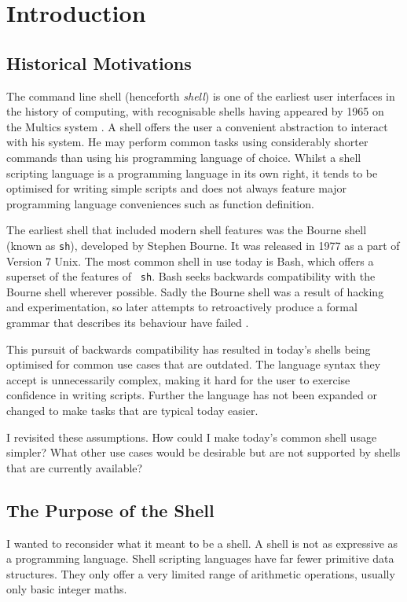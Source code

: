 \documentclass[12pt,twoside,notitlepage]{report}
\begin{document}
\cleardoublepage        %

\setcounter{page}{1}
\pagestyle{headings}

\chapter{Introduction}

\section{Historical Motivations}
The command line shell (henceforth \emph{shell}) is one of the
earliest user interfaces in the history of computing, with
recognisable shells having appeared by 1965 on the Multics system
\cite{multics}. A shell offers the user a convenient abstraction to
interact with his system. He may perform common tasks using
considerably shorter commands than using his programming language of
choice. Whilst a shell scripting language is a programming language in
its own right, it tends to be optimised for writing simple scripts and
does not always feature major programming language conveniences such
as function definition.

The earliest shell that included modern shell features was the Bourne
shell (known as {\tt sh}), developed by Stephen Bourne. It was
released in 1977 as a part of Version 7 Unix. The most common shell in
use today is Bash, which offers a superset of the features of {\tt
  sh}. Bash seeks backwards compatibility with the Bourne shell
wherever possible. Sadly the Bourne shell was a result of hacking and
experimentation, so later attempts to retroactively produce a formal
grammar that describes its behaviour have failed \cite{bourne}.

This pursuit of backwards compatibility has resulted in today's shells
being optimised for common use cases that are outdated. The language
syntax they accept is unnecessarily complex, making it hard for the
user to exercise confidence in writing scripts. Further the language
has not been expanded or changed to make tasks that are typical today easier.

I revisited these assumptions. How could I make today's common shell
usage simpler? What other use cases would be desirable but are not
supported by shells that are currently available?

\section{The Purpose of the Shell}
I wanted to reconsider what it meant to be a shell. A shell is not as
expressive as a programming language. Shell scripting languages have
far fewer primitive data structures. They only offer a very limited
range of arithmetic operations, usually only basic integer maths.
\end{document}
